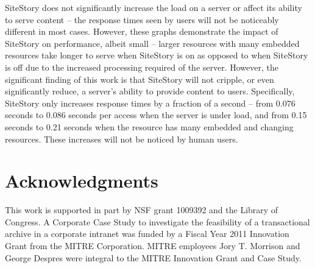 \documentclass[runningheads,a4paper]{llncs}
\begin{document}
SiteStory does not significantly increase the load on a server or affect its ability to serve content -- the response times seen by users will not be noticeably different in most cases. However, these graphs demonstrate the impact of SiteStory on performance, albeit small -- larger resources with many embedded resources take longer to serve when SiteStory is on as opposed to when SiteStory is off due to the increased processing required of the server. However, the significant finding of this work is that SiteStory will not cripple, or even significantly reduce, a server's ability to provide content to users. Specifically, SiteStory only increases response times by a fraction of a second -- from 0.076 seconds to 0.086 seconds per access when the server is under load, and from 0.15 seconds to 0.21 seconds when the resource has many embedded and changing resources. These increases will not be noticed by human users.


\section{Acknowledgments}
\vskip -3mm
This work is supported in part by NSF grant 1009392 and the Library of Congress. A Corporate Case Study to investigate the feasibility of a transactional archive in a corporate intranet was funded by a Fiscal Year 2011 Innovation Grant from the MITRE Corporation. MITRE employees Jory T. Morrison and George Despres were integral to the MITRE Innovation Grant and Case Study.

\end{document}
